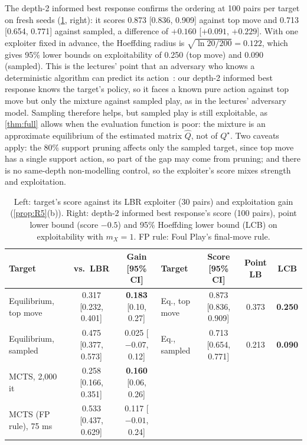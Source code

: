 \documentclass[10pt]{article}
\theoremstyle{plain}
\theoremstyle{definition}
\theoremstyle{remark}
\newcommand{\Qhat}{\hat Q}
\newcommand{\Qstar}{Q^\star}
\begin{document}
The depth-2 informed best response confirms the ordering at 100 pairs per target on fresh seeds (\cref{tab:expl}, right): it scores 0.873 [0.836, 0.909] against top move and 0.713 [0.654, 0.771] against sampled, a difference of $+0.160$ [$+0.091$, $+0.229$]. With one exploiter fixed in advance, the Hoeffding radius is $\sqrt{\ln20/200}=0.122$, which gives 95\% lower bounds on exploitability of 0.250 (top move) and 0.090 (sampled). This is the lectures' point that an adversary who knows a deterministic algorithm can predict its action~\cite{CS535L6}: our depth-2 informed best response knows the target's policy, so it faces a known pure action against top move but only the mixture against sampled play, as in the lectures' adversary model. Sampling therefore helps, but sampled play is still exploitable, as \cref{thm:full} allows when the evaluation function is poor: the mixture is an approximate equilibrium of the estimated matrix $\Qhat$, not of $\Qstar$. Two caveats apply: the 80\% support pruning affects only the sampled target, since top move has a single support action, so part of the gap may come from pruning; and there is no same-depth non-modelling control, so the exploiter's score mixes strength and exploitation.

\begin{table}[h]
\centering\small
\caption{Left: target's score against its LBR exploiter (30 pairs) and exploitation gain (\cref{prop:R5}(b)). Right: depth-2 informed best response's score (100 pairs), point lower bound (score $-0.5$) and 95\% Hoeffding lower bound (LCB) on exploitability with $m_X=1$. FP rule: Foul Play's final-move rule.}
\label{tab:expl}
\begin{tabular}{@{}lcc@{\qquad}lccc@{}}
\toprule
Target & vs.\ LBR & Gain [95\% CI] & Target & Score [95\% CI] & Point LB & LCB \\
\midrule
Equilibrium, top move & 0.317 [0.232, 0.401] & \textbf{0.183} [0.10, 0.27] & Eq., top move & 0.873 [0.836, 0.909] & 0.373 & \textbf{0.250} \\
Equilibrium, sampled & 0.475 [0.377, 0.573] & 0.025 [$-0.07$, 0.12] & Eq., sampled & 0.713 [0.654, 0.771] & 0.213 & \textbf{0.090} \\
MCTS, 2,000 it & 0.258 [0.166, 0.351] & \textbf{0.160} [0.06, 0.26] & & & & \\
MCTS (FP rule), 75 ms & 0.533 [0.437, 0.629] & 0.117 [$-0.01$, 0.24] & & & & \\
\bottomrule
\end{tabular}
\vspace{-0.6em}
\end{table}
\end{document}
